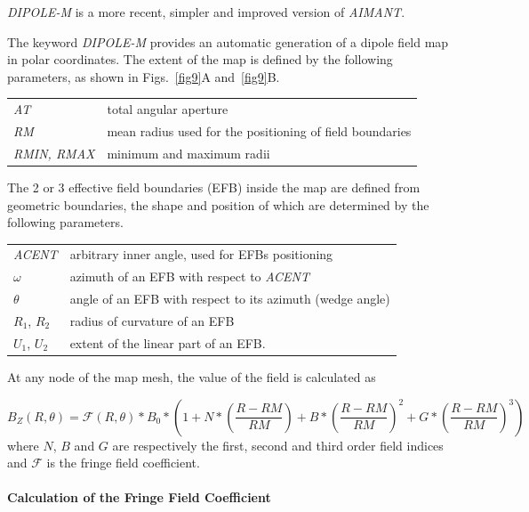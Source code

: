 {\noindent\textsl{DIPOLE-M} is a more recent, simpler and improved version of 
\textsl{AIMANT}.  
\bigskip

\noindent The keyword \textsl{DIPOLE-M} provides an automatic generation of a dipole 
field map in polar coordinates. The extent of the map is defined by the 
following parameters, as shown in Figs.~\ref{fig9}A and~\ref{fig9}B.
\bigskip

 \begin{tabular}{>{\sl}l!{~:}l}
	 AT &  total angular aperture\\
	 RM & mean radius used for the positioning of field boundaries\\
	 RMIN, RMAX
	    &  minimum and maximum radii 
 \end{tabular}
\bigskip
 
\noindent The 2 or 3 effective field boundaries (EFB) inside the map are
defined from geometric boundaries, the shape and position of which are determined by the 
following parameters. 
\bigskip

\begin{tabular}{l!{~:}l}
	 \textsl{ACENT} 
	    & arbitrary inner angle, used for EFBs positioning  \\
	$\omega$ &  azimuth of an EFB with respect to  \textsl{ACENT}\\
	$\theta$ & angle of an EFB with respect to its azimuth (wedge angle)\\ 
	$R_1$, $R_2$  &  radius of curvature of an EFB\\
	$U_1$, $U_2$  &  extent of the linear part of an EFB. 
\end{tabular}
\bigskip


\noindent At  any node  of the map mesh, the value of the field is calculated as 

 \begin{equation}
	 B_Z(R,\theta)  =  \mathcal{F}(R,\theta)  \ast  B_0 \ast  
	      \left(1+N \ast  
	           \left( \dfrac{R-RM }{ RM}\right) 
	           + B \ast  \left(\dfrac{R-RM }{ RM} \right)^2 
	           + G \ast  \left(\dfrac{R-RM }{ RM} \right)^3 
	      \right) 
 	\label{eq3-3-1}
 \end{equation}
%
 where  $ N$, $B $ and $ G $ are  respectively  the first, second and
third order field indices and $ \mathcal{F}$ is the fringe field coefficient. 


\paragraph{Calculation of the Fringe Field Coefficient} 

}
